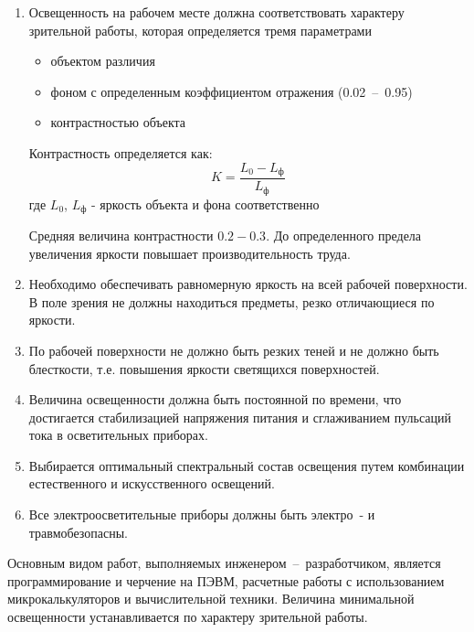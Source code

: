 \begin{enumerate}
    \item   Освещенность на рабочем месте должна соответствовать характеру
            зрительной работы, которая определяется тремя параметрами
        \begin{itemize}
            \item объектом различия
            \item фоном с определенным коэффициентом отражения (0.02~--~0.95)
            \item контрастностью объекта
        \end{itemize}
    Контрастность определяется как:
    \begin{equation}
    \label{lighting_contrast}
        K = \frac{L_0 - L_\text{ф}}{L_\text{ф}}
    \end{equation}
    где $L_0$, $L_\text{ф}$ - яркость объекта и фона соответственно

    Средняя величина контрастности $0.2 - 0.3$. До определенного предела увеличения
    яркости повышает производительность труда.

    \item   Необходимо обеспечивать равномерную яркость на всей рабочей поверхности.
            В поле зрения не должны находиться предметы, резко отличающиеся по яркости.

    \item   По рабочей поверхности не должно быть резких теней и не должно быть
            блесткости, т.е. повышения яркости светящихся поверхностей.

    \item   Величина освещенности должна быть постоянной по времени, что достигается
            стабилизацией напряжения питания и сглаживанием пульсаций тока в
            осветительных приборах.

    \item   Выбирается оптимальный спектральный состав освещения путем комбинации
            естественного и искусственного освещений.

    \item   Все электроосветительные приборы должны быть электро~- и травмобезопасны.
\end{enumerate}

Основным видом работ, выполняемых инженером~--~разработчиком, является программирование
и черчение на ПЭВМ, расчетные работы с использованием микрокалькуляторов и вычислительной
техники. Величина минимальной освещенности устанавливается по характеру зрительной работы.

